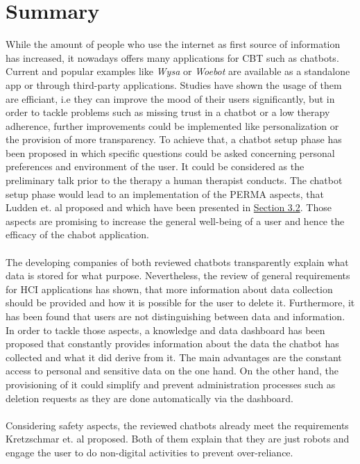 \documentclass[sigconf, nonacm]{acmart}
\begin{document}
\section{Summary}
\label{sec:five}
While the amount of people who use the internet as first source of information has increased\cite{Wyatt2015}, it nowadays offers many applications for CBT such as chatbots. 
\\
Current and popular examples like \emph{Wysa} or \emph{Woebot} are available as a standalone app or through third-party applications. Studies have shown the usage of them are efficiant, i.e they can improve the mood of their users significantly\cite{Fitzpatrick2017,Inkster}, but in order to tackle problems such as missing trust in a chatbot or a low therapy adherence, further improvements could be implemented like personalization 
or the provision of more transparency. To achieve that, a chatbot setup phase has been proposed in which specific questions could be asked concerning personal preferences and environment of the user. It could be considered as the preliminary talk prior to the therapy a human therapist conducts.
The chatbot setup phase would lead to an implementation of the PERMA aspects, that Ludden et. al \cite{Ludden2015} proposed and which have been presented in \hyperref[sec:three_two]{Section 3.2}. Those aspects are promising to increase the general well-being of a user and hence the efficacy of the chabot application.
\\\\
The developing companies of both reviewed chatbots transparently explain what data is stored for what purpose.
Nevertheless, the review of general requirements for HCI applications has shown, that more information about data collection should be provided and how it is possible for the user to delete it\cite{Saglam2021}.
Furthermore, it has been found that users are not distinguishing between data and information\cite{Lee2011}.
In order to tackle those aspects, a knowledge and data dashboard has been proposed that constantly provides information about the data the chatbot has collected and what it did derive from it.
The main advantages are the constant access to personal and sensitive data on the one hand. On the other hand, the provisioning of it could simplify and prevent administration processes such as deletion requests as they are done automatically via the dashboard.
\\\\
Considering safety aspects, the reviewed chatbots already meet the requirements Kretzschmar et. al \cite{Kretzschmar2019} proposed. Both of them explain that they are just robots and engage the user to do non-digital activities to prevent over-reliance.
\end{document}
